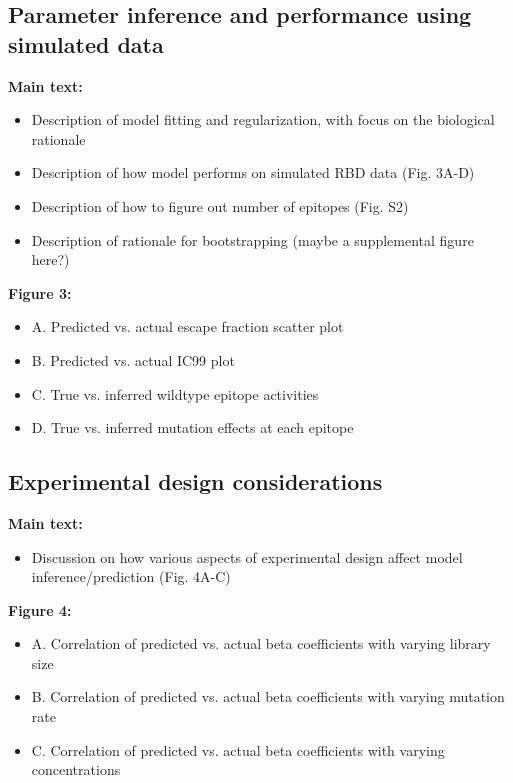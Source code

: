 \documentclass{article}
\begin{document}
\subsection*{Parameter inference and performance using simulated data}

\textbf{Main text:}
\begin{itemize}
	\item Description of model fitting and regularization, with focus on the biological rationale
	\item Description of how model performs on simulated RBD data (Fig. 3A-D)
	\item Description of how to figure out number of epitopes (Fig. S2)
	\item Description of rationale for bootstrapping (maybe a supplemental figure here?)
\end{itemize}


\noindent\textbf{Figure 3:}
\begin{itemize}
	\item A. Predicted vs. actual escape fraction scatter plot
	\item B. Predicted vs. actual IC99 plot
	\item C. True vs. inferred wildtype epitope activities
	\item D. True vs. inferred mutation effects at each epitope
\end{itemize}

\subsection*{Experimental design considerations}

\textbf{Main text:}
\begin{itemize}
	\item Discussion on how various aspects of experimental design affect model inference/prediction (Fig. 4A-C)
\end{itemize}


\noindent\textbf{Figure 4:}
\begin{itemize}
	\item A. Correlation of predicted vs. actual beta coefficients with varying library size
	\item B. Correlation of predicted vs. actual beta coefficients with varying mutation rate
	\item C. Correlation of predicted vs. actual beta coefficients with varying concentrations
\end{itemize}
\end{document}

